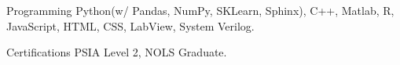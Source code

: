 

\begin{cvskills}

  \cvskill
    {Programming} %
    {Python(w/ Pandas, NumPy, SKLearn, Sphinx), C++, Matlab, R, JavaScript, HTML, CSS, LabView, System Verilog.}  %

  \cvskill
    {Certifications} %
    {PSIA Level 2, NOLS Graduate.} %

\end{cvskills}
